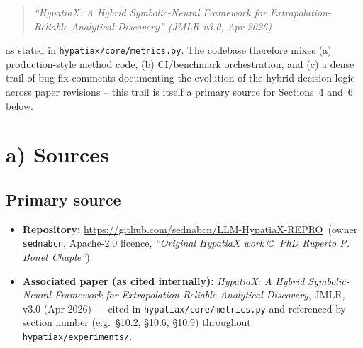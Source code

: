 \documentclass[11pt,a4paper]{article}
\newcommand{\repolink}{\url{https://github.com/sednabcn/LLM-HypatiaX-REPRO}}
\newcommand{\code}[1]{\texttt{\small #1}}
\begin{document}
\begin{quote}\itshape
``HypatiaX: A Hybrid Symbolic-Neural Framework for Extrapolation-Reliable
Analytical Discovery'' (JMLR v3.0, Apr 2026)
\end{quote}

\noindent as stated in \code{hypatiax/core/metrics.py}. The codebase therefore
mixes (a) production-style method code, (b) CI/benchmark orchestration, and
(c) a dense trail of bug-fix comments documenting the evolution of the
hybrid decision logic across paper revisions -- this trail is itself a
primary source for Sections~4 and~6 below.

\section{a) Sources}

\subsection{Primary source}
\begin{itemize}
  \item \textbf{Repository:} \repolink\ (owner \code{sednabcn}, Apache-2.0
        licence, \emph{``Original HypatiaX work \copyright\ PhD Ruperto P.
        Bonet Chaple''}).
  \item \textbf{Associated paper (as cited internally):} \emph{HypatiaX: A
        Hybrid Symbolic-Neural Framework for Extrapolation-Reliable
        Analytical Discovery}, JMLR, v3.0 (Apr 2026) --- cited in
        \code{hypatiax/core/metrics.py} and referenced by section number
        (e.g.\ \S10.2, \S10.6, \S10.9) throughout \code{hypatiax/experiments/}.
\end{itemize}
\end{document}
